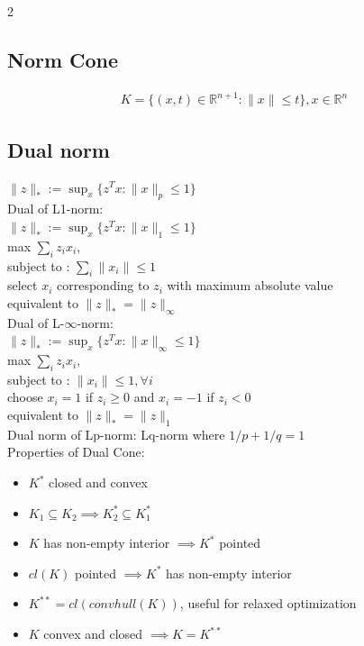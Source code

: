 \documentclass[8pt]{extarticle}
\newcommand{\R}{\mathbb{R}}
\newcommand{\norm}[1]{\|#1\|}
\newcommand{\set}[1]{\{#1\}}
\begin{document}
\begin{multicols*}{2}
  \subsection{Norm Cone}
  \begin{align*}
    K=\set{(x,t) \in \R^{n+1} : \norm{x} \leq t}, x \in \R^n
  \end{align*}
  
  \subsection{Dual norm}
  $\|z\|_* := \sup_x \{z^T x : \|x\|_p \leq 1\}$\\
  
  Dual of L1-norm:\\
  $\|z\|_* := \sup_x \{z^T x : \|x\|_1 \leq 1\}$\\
  max $\sum_i z_i x_i$,\\
  subject to : $\sum_i \|x_i\| \leq 1$\\
  select $x_i$ corresponding to $z_i$ with maximum absolute value\\
  equivalent to $\|z\|_* = \|z\|_{\infty}$\\

  Dual of L-$\infty$-norm:\\
  $\|z\|_* := \sup_x \{z^T x : \|x\|_{\infty} \leq 1\}$\\
  max $\sum_i z_i x_i$,\\
  subject to : $\|x_i\| \leq 1, \forall i$\\
  choose $x_i=1$ if $z_i \geq 0$ and $x_i=-1$ if $z_i < 0$\\
  equivalent to $\|z\|_* = \|z\|_1$\\

  Dual norm of Lp-norm: Lq-norm where $1/p + 1/q = 1$\\

  Properties of Dual Cone:
  \begin{itemize}
  \item $K^*$ closed and convex
  \item $K_1 \subseteq K_2 \implies K_2^* \subseteq K_1^*$
  \item $K$ has non-empty interior $\implies K^*$ pointed
  \item $cl(K)$ pointed $\implies K^*$ has non-empty interior
  \item $K^{**} = cl(convhull(K))$, useful for relaxed optimization
  \item $K$ convex and closed $\implies K=K^{**}$
  \end{itemize}
  

\end{multicols*}
\end{document}
